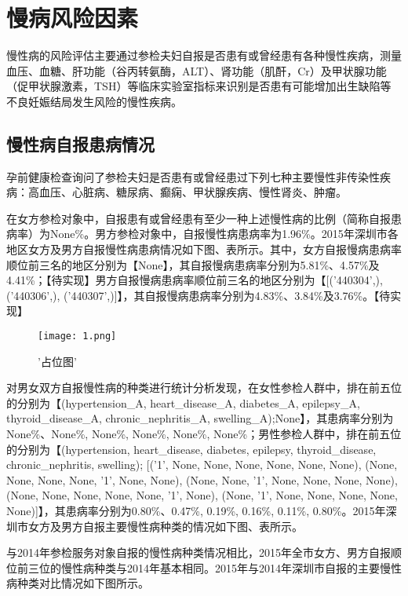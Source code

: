 \chapter{慢病风险因素}

慢性病的风险评估主要通过参检夫妇自报是否患有或曾经患有各种慢性疾病，测量血压、血糖、肝功能（谷丙转氨酶，ALT）、肾功能（肌酐，Cr）及甲状腺功能（促甲状腺激素，TSH）等临床实验室指标来识别是否患有可能增加出生缺陷等不良妊娠结局发生风险的慢性疾病。

\section{慢性病自报患病情况}

孕前健康检查询问了参检夫妇是否患有或曾经患过下列七种主要慢性非传染性疾病：高血压、心脏病、糖尿病、癫痫、甲状腺疾病、慢性肾炎、肿瘤。

在女方参检对象中，自报患有或曾经患有至少一种上述慢性病的比例（简称自报患病率）为None\%。男方参检对象中，自报慢性病患病率为1.96\%。2015年深圳市各地区女方及男方自报慢性病患病情况如下图、表所示。其中，女方自报慢病患病率顺位前三名的地区分别为【None】，其自报慢病患病率分别为5.81\%、4.57\%及4.41\%；【待实现】男方自报慢病患病率顺位前三名的地区分别为【[('440304',), ('440306',), ('440307',)]】，其自报慢病患病率分别为4.83\%、3.84\%及3.76\%。【待实现】


\begin{figure}[htbp]
	\centering
	\texttt{[image: 1.png]}
	\caption{'占位图'}
	\label{}
\end{figure}


对男女双方自报慢性病的种类进行统计分析发现，在女性参检人群中，排在前五位的分别为【(hypertension\_A, heart\_disease\_A, diabetes\_A, epilepsy\_A, thyroid\_disease\_A, chronic\_nephritis\_A, swelling\_A);None】，其患病率分别为None\%、None\%, None\%, None\%, None\%, None\%；男性参检人群中，排在前五位的分别为【(hypertension, heart\_disease, diabetes, epilepsy, thyroid\_disease, chronic\_nephritis, swelling); [('1', None, None, None, None, None, None), (None, None, None, None, '1', None, None), (None, None, '1', None, None, None, None), (None, None, None, None, None, '1', None), (None, '1', None, None, None, None, None)]】，其患病率分别为0.80\%、0.47\%, 0.19\%, 0.16\%, 0.11\%, 0.80\%。2015年深圳市女方及男方自报主要慢性病种类的情况如下图、表所示。

 

与2014年参检服务对象自报的慢性病种类情况相比，2015年全市女方、男方自报顺位前三位的慢性病种类与2014年基本相同。2015年与2014年深圳市自报的主要慢性病种类对比情况如下图所示。

